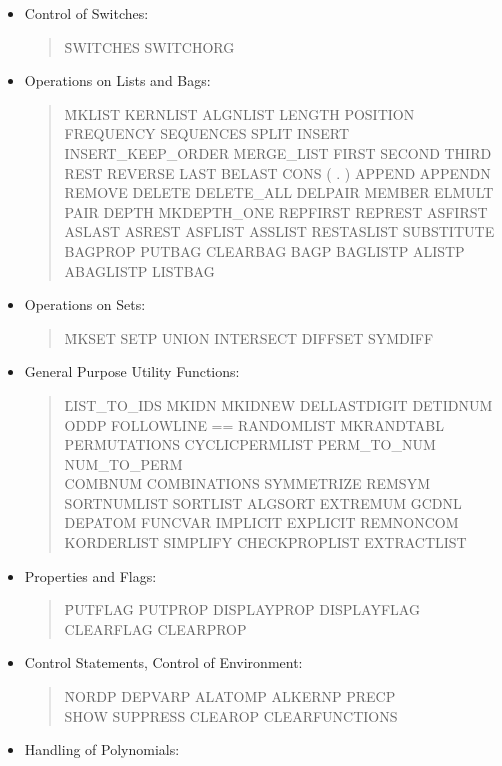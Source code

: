 \begin{itemize}
\item{Control of Switches:}
\begin{quotation}
\noindent
\f{SWITCHES SWITCHORG}
\end{quotation}
\item{Operations on Lists and Bags:}
\begin{quotation}
\noindent
\f{MKLIST KERNLIST ALGNLIST LENGTH \nl
POSITION FREQUENCY SEQUENCES SPLIT \nl
INSERT INSERT\_KEEP\_ORDER MERGE\_LIST \nl
FIRST SECOND THIRD REST REVERSE LAST \nl
BELAST CONS ( . ) APPEND APPENDN \nl
REMOVE DELETE DELETE\_ALL DELPAIR \nl
MEMBER ELMULT PAIR DEPTH MKDEPTH\_ONE \nl
REPFIRST REPREST ASFIRST ASLAST ASREST \nl
ASFLIST ASSLIST RESTASLIST SUBSTITUTE \nl
BAGPROP PUTBAG CLEARBAG BAGP BAGLISTP \nl
ALISTP ABAGLISTP LISTBAG }
\end{quotation}
\item{Operations on Sets:}
\begin{quotation}
\noindent
\f{MKSET SETP UNION INTERSECT DIFFSET SYMDIFF}
\end{quotation}
\item{General Purpose Utility Functions:}
\begin{quotation}
\noindent
\f{LIST\_TO\_IDS MKIDN MKIDNEW DELLASTDIGIT DETIDNUM \\
ODDP FOLLOWLINE  == RANDOMLIST MKRANDTABL \\
PERMUTATIONS CYCLICPERMLIST PERM\_TO\_NUM NUM\_TO\_PERM\\ 
COMBNUM COMBINATIONS SYMMETRIZE REMSYM \\
SORTNUMLIST SORTLIST ALGSORT EXTREMUM GCDNL\\
DEPATOM FUNCVAR IMPLICIT EXPLICIT REMNONCOM \\
KORDERLIST SIMPLIFY CHECKPROPLIST EXTRACTLIST} 
\end{quotation}
\item{ Properties and Flags:}
\begin{quotation}
\noindent
\f{PUTFLAG PUTPROP DISPLAYPROP DISPLAYFLAG \\
CLEARFLAG CLEARPROP }
\end{quotation}
\item{ Control Statements, Control of Environment:}
\begin{quotation}
\noindent
\f{NORDP DEPVARP ALATOMP ALKERNP PRECP \\
 SHOW SUPPRESS CLEAROP CLEARFUNCTIONS }
\end{quotation}
\item{Handling of Polynomials:}

\end{itemize}
